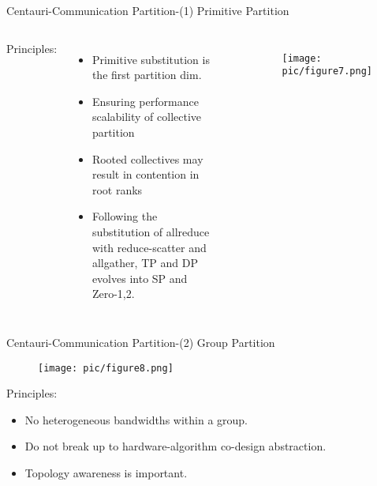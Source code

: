 \documentclass{beamer}
\begin{document}
\begin{frame}{Centauri-Communication Partition-(1) Primitive Partition}
\begin{columns}
    Principles:
	\begin{itemize}
		\item {Primitive substitution is the first partition dim.}
            \item {Ensuring performance scalability of collective partition}
            \item {Rooted collectives may result in contention in root ranks}
            \item Following the substitution of allreduce with reduce-scatter and allgather, TP and DP evolves into SP and Zero-1,2.
	\end{itemize}\
	\begin{figure}
		\centering
		\texttt{[image: pic/figure7.png]}
		\label{secert_sharing_figures}
	\end{figure}
\end{columns}
\end{frame}

\begin{frame}{Centauri-Communication Partition-(2) Group Partition}
\begin{figure}
	\centering
		\texttt{[image: pic/figure8.png]}
		\label{secert_sharing_figures}
\end{figure}

Principles:
\begin{itemize}
		\item {No heterogeneous bandwidths within a group.}
            \item {Do not break up to hardware-algorithm co-design abstraction.}
            \item {Topology awareness is important.}
	\end{itemize}

\end{frame}
\end{document}
